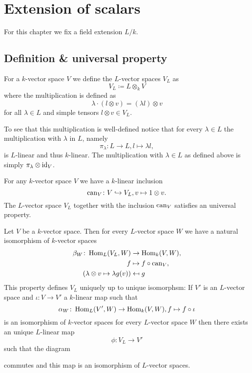 \chapter{Extension of scalars}\label{app: extension of scalars}
For this chapter we fix a field extension $L/k$.




\section{Definition \& universal property}


\begin{defi}
 For a $k$-vector space $V$ we define the $L$-vector spaces $V_L$ as
 \[
  V_L \coloneqq L \otimes_k V
 \]
 where the multiplication is defined as
 \[
  \lambda \cdot (l \otimes v) = (\lambda l) \otimes v
 \]
 for all $\lambda \in L$ and simple tensors $l \otimes v \in V_L$.
\end{defi}

To see that this multiplication is well-defined notice that for every $\lambda \in L$ the multiplication with $\lambda$ in $L$, namely
\[
 \pi_\lambda \colon L \to L, l \mapsto \lambda l,
\]
is $L$-linear and thus $k$-linear. The multiplication with $\lambda \in L$ as defined above is simply $\pi_\lambda \otimes \operatorname{id}_V$.


For any $k$-vector space $V$ we have a $k$-linear inclusion
\[
 \operatorname{can}_V \colon V \hookrightarrow V_L, v \mapsto 1 \otimes v.
\]
The $L$-vector space $V_L$ together with the inclusion $\operatorname{can}_V$ satisfies an universal property.


\begin{thrm}
 Let $V$ be a $k$-vector space. Then for every $L$-vector space $W$ we have a natural isomorphism of $k$-vector spaces
 \begin{align*}
             \beta_W \colon \operatorname{Hom}_L(V_L, W) &\to \operatorname{Hom}_k(V,W), \\
                                         f &\mapsto f \circ \operatorname{can}_V, \\
  (\lambda \otimes v \mapsto \lambda g(v)) &\mapsfrom g
 \end{align*}
 This property defines $V_L$ uniquely up to unique isomorphsm: If $V'$ is an $L$-vector space and $\iota \colon V \to V'$ a $k$-linear map such that
 \[
  \alpha_W \colon \operatorname{Hom}_L(V', W) \to \operatorname{Hom}_k(V,W), f \mapsto f \circ \iota
 \]
 is an isomorphism of $k$-vector spaces for every $L$-vector space $W$ then there exists an unique $L$-linear map
 \[
  \phi \colon V_L \to V'
 \]
 such that the diagram
 \begin{center}
 \end{center}
 commutes and this map is an isomorphism of $L$-vector spaces.
\end{thrm}


